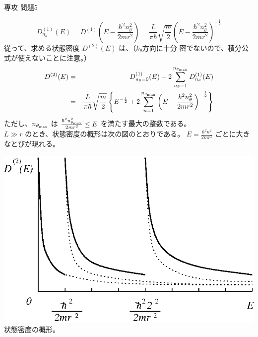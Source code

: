 \documentclass[fleqn]{jbook}
\begin{document}
\begin{answer}{専攻 問題5}{}
\begin{subanswers}
\begin{subsubanswers}
%
    \[ D^{(1)}_{n_{\theta}}(E)%
        = D^{(1)}\left(E-\frac{\hbar^2n_{\theta}^2}{2mr^2}\right)%
        = \frac{L}{\pi\hbar}\sqrt{\frac{m}{2}} \left(%
            E-\frac{\hbar^2n_{\theta}^2}{2mr^2}
          \right)^{-\frac{1}{2}} \]
%
    従って、求める状態密度 $D^{(2)}(E)$ は、（$k_\theta$方向に十分
    密でないので、積分公式が使えないことに注意。）
%
    \begin{eqnarray*}
      D^{(2)}(E) &=&  D^{(1)}_{n_{\theta}=0}(E)%
                  + 2\sum_{n_{\theta}=1}^{n_{\theta_{\rm max}}}%
                    D^{(1)}_{n_{\theta}}(E) \\
               &=&  \frac{L}{\pi\hbar}\sqrt{\frac{m}{2}}%
                    \left\{%
                       E^{-\frac{1}{2}}%
                     + 2\sum_{n=1}^{n_{\theta_{\rm max}}} \left(%
                          E-\frac{\hbar^2n_{\theta}^2}{2mr^2}%
                       \right)^{-\frac{1}{2}}%
                    \right\}
    \end{eqnarray*}
%
    ただし、$n_{\theta_{\rm max}}$ は
    $\frac{\hbar^2n_{\theta_{\rm max}}^2}{2mr^2}\leq E$
    を満たす最大の整数である。\\
%
    $L\gg r$ のとき、状態密度の概形は次の図のとおりである。
    $E=\frac{\hbar^2n^2}{2mr^2}$ ごとに大きなとびが現れる。
%
    \begin{center}
      \mbox{\includegraphics[clip]{1995phy5-4.eps}}\\
      状態密度の概形。
    \end{center}

  \end{subsubanswers}


\end{subanswers}
\end{answer}
\end{document}
